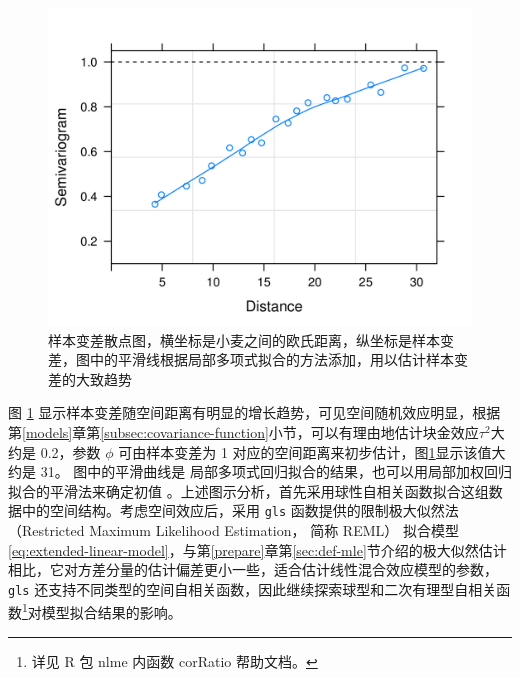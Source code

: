 \documentclass[12pt,a4paper,UTF8,twoside]{book}
\theoremstyle{definition}
\theoremstyle{definition}
\theoremstyle{definition}
\theoremstyle{remark}
\begin{document}
\begin{figure}

{\centering \includegraphics[width=0.7\linewidth]{figures/Yields-Variogram} 

}

\caption{样本变差散点图，横坐标是小麦之间的欧氏距离，纵坐标是样本变差，图中的平滑线根据局部多项式拟合的方法添加，用以估计样本变差的大致趋势}\label{fig:yields-variogram}
\end{figure}

图 \ref{fig:yields-variogram}
显示样本变差随空间距离有明显的增长趋势，可见空间随机效应明显，根据第\ref{models}章第\ref{subsec:covariance-function}小节，可以有理由地估计块金效应\(\tau^2\)大约是
0.2，参数 \(\phi\) 可由样本变差为 1
对应的空间距离来初步估计，图\ref{fig:yields-variogram}显示该值大约是
31。 图中的平滑曲线是
局部多项式回归拟合的结果，也可以用局部加权回归拟合的平滑法来确定初值
\citep{Xie2008COS}。上述图示分析，首先采用球性自相关函数拟合这组数据中的空间结构。考虑空间效应后，采用
\texttt{gls} 函数提供的限制极大似然法 （Restricted Maximum Likelihood
Estimation， 简称 REML）
拟合模型\eqref{eq:extended-linear-model}，与第\ref{prepare}章第\ref{sec:def-mle}节介绍的极大似然估计相比，它对方差分量的估计偏差更小一些\citep{Diggle2007}，适合估计线性混合效应模型的参数，\texttt{gls}
还支持不同类型的空间自相关函数，因此继续探索球型和二次有理型自相关函数\footnote{详见 R 包 nlme 内函数 corRatio 帮助文档。}对模型拟合结果的影响。
\end{document}
